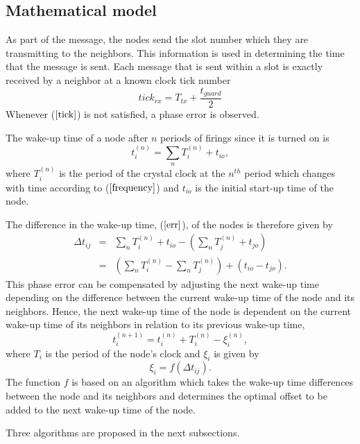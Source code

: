 \documentclass[journal]{IEEEtran}
\begin{document}
\subsection{\textbf{Mathematical model}}
As part of the message, the nodes send the slot number which they
are transmitting to the neighbors. This information is used in
determining the time that the message is sent. Each message that is
sent within a slot is exactly received by a neighbor at a known
clock tick number
\begin{equation}
tick_{rx} = T_{tx}+ \dfrac{t_{guard}}{2} \label{tick}
\end{equation}
Whenever ($\ref{tick}$) is not satisfied, a phase error is observed. \par
The wake-up time of a node after $n$ periods of firings since it is turned on is
\begin{equation}
t_i^{(n)} = \sum_{n} T_i^{(n)} + t_{io},
\end{equation}
where  $T_i^{(n)}$ is the period of the crystal clock at the $n^{th}$ period which changes with time according to ($\ref{frequency}$) and $t_{io}$ is the initial start-up time of the node.\par
The difference in the wake-up time, ($\ref{err}$), of the nodes is therefore given by
\begin{eqnarray}
\Delta t_{ij} & = & \sum_{n}T_i^{(n)} + t_{io}- (\sum_{n}T_j^{(n)} +
t_{jo}) \\ &=& (\sum_{n}T_i^{(n)} - \sum_{n}T_j^{(n)}) +
(t_{io}-t_{jo}).
\end{eqnarray}
This phase error can be compensated by adjusting the next wake-up time
depending on the difference between the current wake-up time of the
node and its neighbors. Hence, the next wake-up time of the node is
dependent on the current wake-up time of its neighbors in relation
to its previous wake-up time,
\begin{equation}
t_i^{(n+1)} = t_i^{(n)} + T_i^{(n)} - \xi_i^{(n)} ,
\end{equation}
where $T_i$ is the period of the node's clock and $\xi_i$ is given
by
\begin{equation}
\xi_i = f(\Delta t_{ij}).
\end{equation}
The function $f$ is based on an algorithm which takes the wake-up
time differences between the node and its neighbors and determines
the optimal offset to be added to the next wake-up time of the node.
\par Three algorithms are proposed in the next subsections.
\end{document}
